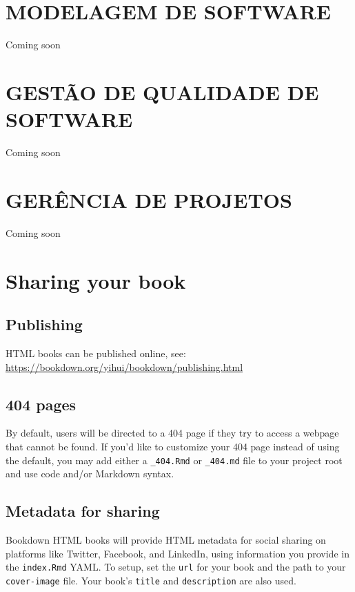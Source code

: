 \documentclass[
]{book}
\begin{document}
\chapter{MODELAGEM DE SOFTWARE}\label{modelagem-de-software}

Coming soon

\chapter{GESTÃO DE QUALIDADE DE SOFTWARE}\label{gestuxe3o-de-qualidade-de-software}

Coming soon

\chapter{GERÊNCIA DE PROJETOS}\label{geruxeancia-de-projetos}

Coming soon

\chapter{Sharing your book}\label{sharing-your-book}

\section{Publishing}\label{publishing}

HTML books can be published online, see: \url{https://bookdown.org/yihui/bookdown/publishing.html}

\section{404 pages}\label{pages}

By default, users will be directed to a 404 page if they try to access a webpage that cannot be found. If you'd like to customize your 404 page instead of using the default, you may add either a \texttt{\_404.Rmd} or \texttt{\_404.md} file to your project root and use code and/or Markdown syntax.

\section{Metadata for sharing}\label{metadata-for-sharing}

Bookdown HTML books will provide HTML metadata for social sharing on platforms like Twitter, Facebook, and LinkedIn, using information you provide in the \texttt{index.Rmd} YAML. To setup, set the \texttt{url} for your book and the path to your \texttt{cover-image} file. Your book's \texttt{title} and \texttt{description} are also used.
\end{document}
